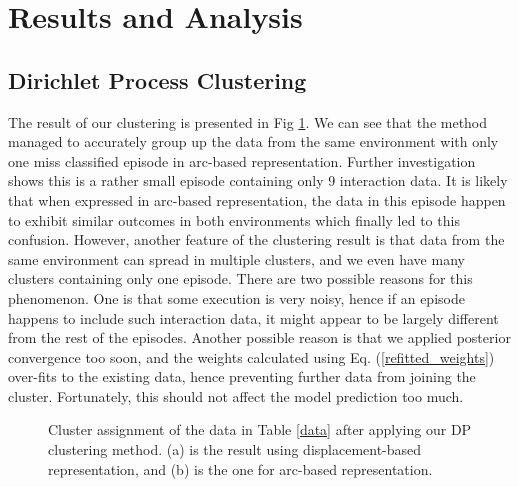 

\section{Results and Analysis}

\subsection{Dirichlet Process Clustering}
The result of our clustering is presented in Fig \ref{clustering_results}.
We can see that the method managed to accurately group up the data from the same environment with only one miss classified episode in arc-based representation.
Further investigation shows this is a rather small episode containing only 9 interaction data. 
It is likely that when expressed in arc-based representation, the data in this episode happen to exhibit similar outcomes in both environments which finally led to this confusion.
However, another feature of the clustering result is that data from the same environment can spread in multiple clusters, and we even have many clusters containing only one episode.
There are two possible reasons for this phenomenon.
One is that some execution is very noisy, hence if an episode happens to include such interaction data, it might appear to be largely different from the rest of the episodes.
Another possible reason is that we applied posterior convergence too soon, and the weights calculated using Eq. (\ref{refitted_weights}) over-fits to the existing data, hence preventing further data from joining the cluster.
Fortunately, this should not affect the model prediction too much.


\begin{figure}[h]
\centering
{}
{}
\caption{Cluster assignment of the data in Table \ref{data} after applying our DP clustering method.
(a) is the result using displacement-based representation, and (b) is the one for arc-based representation.}
\label{clustering_results}
\end{figure}


